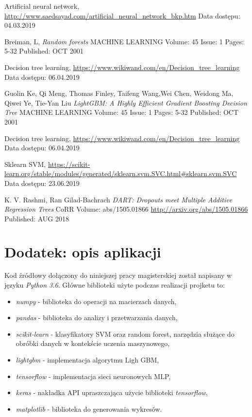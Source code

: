 \documentclass[a4paper, twoside, 11pt, openright]{article}
\begin{document}
\begin{thebibliography}{9}
	Artificial neural network, \url{http://www.saedsayad.com/artificial_neural_network_bkp.htm} 
	Data dostępu: 04.03.2019

	Breiman, L, 
  \textit{Random forests}
	MACHINE LEARNING  Volume: 45   Issue: 1   Pages: 5-32   Published: OCT 2001


	Decision tree learning, \url{https://www.wikiwand.com/en/Decision_tree_learning} 
	Data dostępu: 06.04.2019


Guolin Ke, Qi Meng, Thomas Finley, Taifeng Wang,Wei Chen, Weidong Ma, Qiwei Ye, Tie-Yan Liu
  \textit{LightGBM: A Highly Efficient Gradient Boosting Decision Tree}
	MACHINE LEARNING  Volume: 45   Issue: 1   Pages: 5-32   Published: OCT 2001

	Decision tree learning, \url{https://www.wikiwand.com/en/Decision_tree_learning} 
	Data dostępu: 06.04.2019

	Sklearn SVM, \url{https://scikit-learn.org/stable/modules/generated/sklearn.svm.SVC.html#sklearn.svm.SVC}
	Data dostępu: 23.06.2019

	K. V. Rashmi, Ran Gilad-Bachrach
	\textit{DART: Dropouts meet Multiple Additive Regression Trees}
	CoRR Volume: abs/1505.01866 \url{http://arxiv.org/abs/1505.01866} Published: AUG 2018

\end{thebibliography}

\listoffigures
 
\listoftables


\section{Dodatek: opis aplikacji}


Kod źródłowy dołączony do niniejszej pracy magisterskiej został napisany w języku \textit{Python 3.6}. Główne biblioteki użyte podczas realizacji projketu to:
\begin{itemize}
    \item \textit{numpy} - biblioteka do operacji na macierzach danych,
    \item \textit{pandas} - biblioteka do analizy i przetwarzania danych,
    \item \textit{scikit-learn} - klasyfikatory SVM oraz random forest, narzędzia służące do obróbki danych w kontekście uczenia maszynowego,
    \item \textit{lightgbm} - implementacja algorytmu Ligh GBM,
    \item \textit{tensorflow} - implementacja sieci neuronowych MLP,
    \item \textit{keras} - nakładka API upraszczająca użycie biblioteki \textit{tensorflow},
    \item \textit{matplotlib} - biblioteka do generowania wykresów.
\end{itemize}
\end{document}
